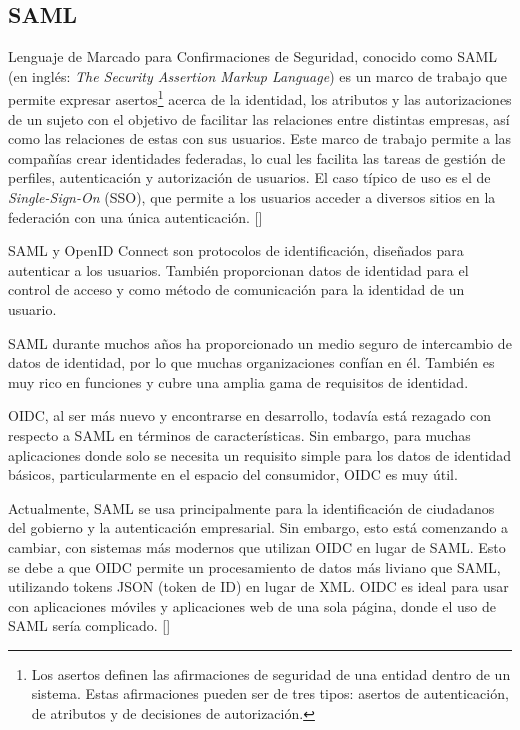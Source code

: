 \subsection*{SAML}
Lenguaje de Marcado para Confirmaciones de Seguridad, conocido como SAML (en inglés: \textit{The Security Assertion Markup Language}) es un marco de trabajo que permite expresar asertos\footnote{ Los asertos definen las afirmaciones de seguridad de una entidad dentro de un sistema. Estas afirmaciones pueden ser de tres tipos: asertos de autenticación, de atributos y de decisiones de autorización.} acerca de la identidad, los atributos y las autorizaciones de un sujeto con el objetivo de facilitar las relaciones entre distintas empresas, así como las relaciones de estas con sus usuarios. Este marco de trabajo permite a las compañías crear identidades federadas, lo cual les facilita las tareas de gestión de perfiles, autenticación y autorización de usuarios. El caso típico de uso es el de \textit{Single-Sign-On }(SSO), que permite a los usuarios acceder a diversos sitios en la federación con una única autenticación. [\cite{sanchez2009estudio}]

SAML y OpenID Connect son protocolos de identificación, diseñados para autenticar a los usuarios. También proporcionan datos de identidad para el control de acceso y como método de comunicación para la identidad de un usuario.

SAML durante muchos años ha proporcionado un medio seguro de intercambio de datos de identidad, por lo que muchas organizaciones confían en él. También es muy rico en funciones y cubre una amplia gama de requisitos de identidad.


OIDC, al ser más nuevo y encontrarse en desarrollo, todavía está rezagado con respecto a SAML en términos de características. Sin embargo, para muchas aplicaciones donde solo se necesita un requisito simple para los datos de identidad básicos, particularmente en el espacio del consumidor, OIDC es muy útil.

Actualmente, SAML se usa principalmente para la identificación de ciudadanos del gobierno y la autenticación empresarial. Sin embargo, esto está comenzando a cambiar, con sistemas más modernos que utilizan OIDC en lugar de SAML. Esto se debe a que OIDC permite un procesamiento de datos más liviano que SAML, utilizando tokens JSON (token de ID) en lugar de XML. OIDC es ideal para usar con aplicaciones móviles y aplicaciones web de una sola página, donde el uso de SAML sería complicado. [\cite{naik2017securing}]

